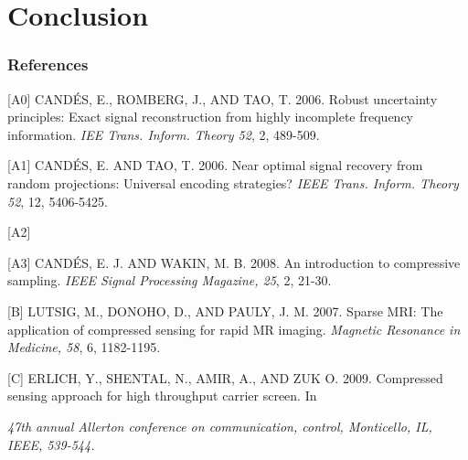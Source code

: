 \documentclass{article} %
\begin{document}
\section{Conclusion}








\subsubsection*{References}
\small{



[A0] CAND\'{E}S, E., ROMBERG, J., AND TAO, T. 2006. Robust uncertainty principles: Exact signal reconstruction from highly incomplete frequency information. {\it IEE Trans. Inform. Theory 52}, 2, 489-509.

[A1] CAND\'{E}S, E. AND TAO, T. 2006. Near optimal signal recovery from random projections: Universal encoding strategies? {\it IEEE Trans. Inform. Theory 52}, 12, 5406-5425.

[A2] 

[A3] CAND\'{E}S, E. J. AND WAKIN, M. B. 2008. An introduction to compressive sampling. {\it IEEE Signal Processing Magazine, 25}, 2, 21-30.



[B] LUTSIG, M., DONOHO, D., AND PAULY, J. M. 2007. Sparse MRI: The application of compressed sensing for rapid MR imaging. {\it Magnetic Resonance in Medicine, 58}, 6, 1182-1195.


[C] ERLICH, Y., SHENTAL, N., AMIR, A., AND ZUK O. 2009. Compressed sensing approach for high throughput carrier screen. In {\it 47th annual Allerton conference on communication, control, Monticello, IL, IEEE, 539-544.


}}
\end{document}
